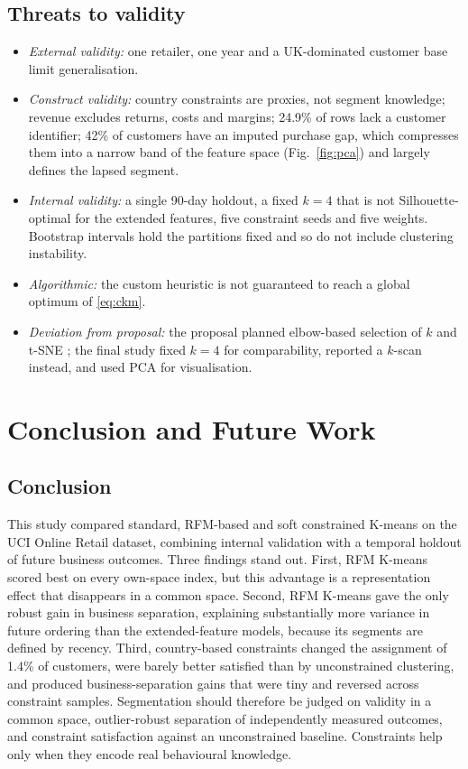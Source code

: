 \documentclass[conference,10pt]{IEEEtran}
\begin{document}
\subsection{Threats to validity}
\begin{itemize}
  \item \emph{External validity:} one retailer, one year and a UK-dominated
  customer base limit generalisation.
  \item \emph{Construct validity:} country constraints are proxies, not
  segment knowledge; revenue excludes returns, costs and margins; 24.9\% of
  rows lack a customer identifier; 42\% of customers have an imputed purchase
  gap, which compresses them into a narrow band of the feature space
  (Fig.~\ref{fig:pca}) and largely defines the lapsed segment.
  \item \emph{Internal validity:} a single 90-day holdout, a fixed $k=4$
  that is not Silhouette-optimal for the extended features, five constraint
  seeds and five weights. Bootstrap intervals hold the partitions fixed and
  so do not include clustering instability.
  \item \emph{Algorithmic:} the custom heuristic is not guaranteed to reach
  a global optimum of \eqref{eq:ckm}.
  \item \emph{Deviation from proposal:} the proposal planned elbow-based
  selection of $k$ and t-SNE \cite{vandermaaten2008tsne}; the final study
  fixed $k=4$ for comparability, reported a $k$-scan instead, and used PCA
  \cite{jolliffe2016pca} for visualisation.
\end{itemize}

\section{Conclusion and Future Work}
\label{sec:conclusion}

\subsection{Conclusion}
This study compared standard, RFM-based and soft constrained K-means on the
UCI Online Retail dataset, combining internal validation with a temporal
holdout of future business outcomes. Three findings stand out. First, RFM
K-means scored best on every own-space index, but this advantage is a
representation effect that disappears in a common space. Second, RFM K-means
gave the only robust gain in business separation, explaining substantially
more variance in future ordering than the extended-feature models, because
its segments are defined by recency. Third, country-based constraints changed
the assignment of 1.4\% of customers, were barely better satisfied than by
unconstrained clustering, and produced business-separation gains that were
tiny and reversed across constraint samples. Segmentation should therefore be
judged on validity in a common space, outlier-robust separation of
independently measured outcomes, and constraint satisfaction against an
unconstrained baseline. Constraints help only when they encode real
behavioural knowledge.
\end{document}

